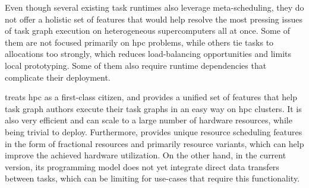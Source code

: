 Even though several existing task runtimes also leverage meta-scheduling, they do not offer a
holistic set of features that would help resolve the most pressing issues of task graph execution
on heterogeneous supercomputers all at once. Some of them are not focused primarily on
\gls{hpc} problems, while others tie tasks to allocations too strongly, which reduces
load-balancing opportunities and limits local prototyping. Some of them also require runtime
dependencies that complicate their deployment.

\hyperqueue{} treats \gls{hpc} as a first-class citizen, and provides a
unified set of features that help task graph authors execute their task graphs in an easy way on
\gls{hpc} clusters. It is also very efficient and can scale to a large number of
hardware resources, while being trivial to deploy. Furthermore, \hyperqueue{} provides
unique resource scheduling features in the form of fractional resources and primarily resource
variants, which can help improve the achieved hardware utilization. On the other hand, in the
current version, its programming model does not yet integrate direct data transfers between tasks,
which can be limiting for use-cases that require this functionality.

